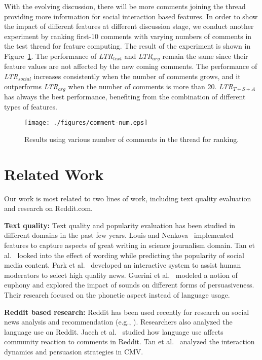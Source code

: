 \documentclass[11pt]{article}
\begin{document}
With the evolving discussion, there will be more comments joining the thread providing more information for social interaction based features. In order to show the impact of different features at different discussion stage, we conduct another experiment by ranking first-10 comments with varying numbers of comments in the test thread for feature computing. The result of the experiment is shown in Figure~\ref{fig:comment-num}. The performance of \emph{LTR$_{text}$} and \emph{LTR$_{arg}$} remain the same since their feature values are not affected by the new coming comments. The performance of \emph{LTR$_{social}$} increases consistently when the number of comments grows,  and it outperforms \emph{LTR$_{arg}$} when the number of comments is more than 20.   \emph{LTR$_{T+S+A}$} has always the best performance, benefiting from the combination of different types of features. 

\begin{figure}
\centering
\texttt{[image: ./figures/comment-num.eps]}
\caption{Results using various number of comments in the thread for ranking.}
\label{fig:comment-num}
\end{figure}

\section{Related Work}
Our work is most related to two lines of work, including text quality evaluation and research on Reddit.com.

\textbf{Text quality:} Text quality and popularity evaluation has been studied in different domains in the past few years. Louis and Nenkova~ implemented features to capture aspects of great writing in science journalism domain. Tan et al.~ looked into the effect of wording while predicting the popularity of social media content. Park et al.~ developed an interactive system to assist human moderators to select high quality news. Guerini et al.~ modeled a notion of euphony and explored the impact of sounds on different forms of persuasiveness. Their research focused on the phonetic aspect instead of language usage. 

\textbf{Reddit based research:} Reddit has been used recently for research on social news analysis and recommendation (e.g., \cite{buntain2014identifying}). Researchers also analyzed the language use on Reddit. Jaech et al.~ studied how language use affects community reaction to comments in Reddit. Tan et al.~ analyzed the interaction dynamics and persuasion strategies in CMV. 
\end{document}
